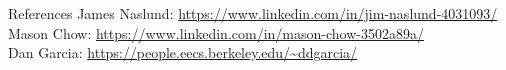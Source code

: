 \documentclass{resume} %
\begin{document}
\begin{rSection}{References}
James Naslund: \url{https://www.linkedin.com/in/jim-naslund-4031093/} \\
Mason Chow: \url{https://www.linkedin.com/in/mason-chow-3502a89a/} \\
Dan Garcia: \url{https://people.eecs.berkeley.edu/~ddgarcia/}
\end{rSection}
\end{document}
